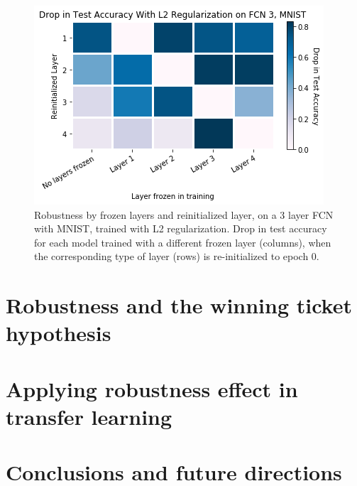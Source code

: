 \documentclass{article}
\begin{document}
\begin{figure}
  \includegraphics[width=\linewidth]{images/fc3_mnist_l2_reg_drop_in_acc_by_layer.png}
  \caption{Robustness by frozen layers and reinitialized layer, on a 3 layer FCN with MNIST, trained with L2 regularization. Drop in test accuracy for each model trained with a different frozen layer (columns), when the corresponding type of layer (rows) is re-initialized to epoch 0.}
  \label{fig:fc3_l2_drop_by_layer_type}
\end{figure}

\section{Robustness and the winning ticket hypothesis}
    
\section{Applying robustness effect in transfer learning}

\section{Conclusions and future directions}


\end{document}
